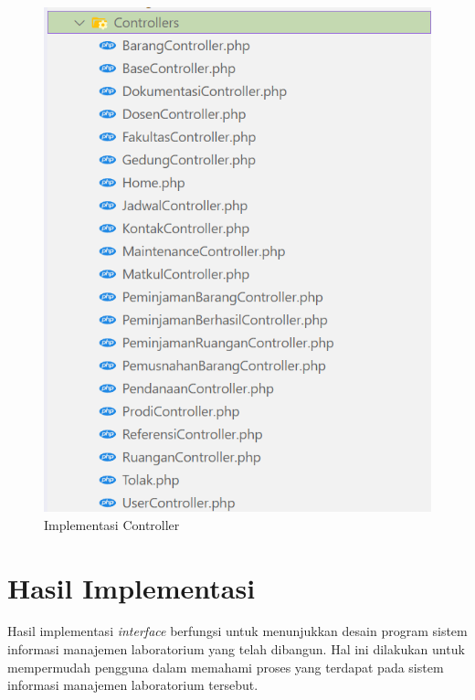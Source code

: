 \begin{figure}
	\centering
	\includegraphics[width=0.82\linewidth]{konten//gambar/implementasi-folder/folder-controller.png}
	\caption{Implementasi Controller}
	\label{fig:implementasi-controller}
\end{figure}

\section{Hasil Implementasi}
Hasil implementasi \textit{interface} berfungsi untuk menunjukkan desain program sistem informasi manajemen laboratorium yang telah dibangun. Hal ini dilakukan untuk mempermudah pengguna dalam memahami proses yang terdapat pada sistem informasi manajemen laboratorium tersebut.

